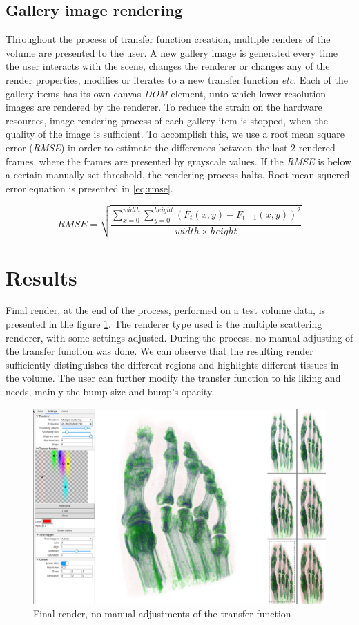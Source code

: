 \documentclass{egpubl-eurovis-short}
\begin{document}
\subsection{Gallery image rendering}
Throughout the process of transfer function creation, multiple renders of the volume are presented to the user. A new gallery image is generated every time the user interacts with the scene, changes the renderer or changes any of the render properties, modifies or iterates to a new transfer function \textit{etc}. Each of the gallery items has its own canvas \textit{DOM} element, unto which lower resolution images are rendered by the renderer. To reduce the strain on the hardware resources, image rendering process of each gallery item is stopped, when the quality of the image is sufficient. To accomplish this, we use a root mean square error (\textit{RMSE}) in order to estimate the differences between the last 2 rendered frames, where the frames are presented by grayscale values. If the \textit{RMSE} is below a certain manually set threshold, the rendering process halts.
Root mean squered error equation is presented in \ref{eq:rmse}.

\begin{equation}
\label{eq:rmse}
RMSE = \sqrt{\frac{\sum_{x=0}^{width}   \sum^{height}_{y=0}  (F_{t}(x,y) - F_{t-1}(x,y))^2}{width \times height}}
\end{equation}

\section{Results}
Final render, at the end of the process, performed on a test volume data, is presented in the figure \ref{fig:final}. The renderer type used is the multiple scattering renderer, with some settings adjusted. During the process, no manual adjusting of the transfer function was done. We can observe that the resulting render sufficiently distinguishes the different regions and highlights different tissues in the volume. The user can further modify the transfer function to his liking and needs, mainly the bump size and bump's opacity. 

\begin{figure}[htb]
  \includegraphics[width=.8\linewidth]{final_render.png}
   \caption{\label{fig:final}
    Final render, no manual adjustments of the transfer function}
\end{figure}
\end{document}
